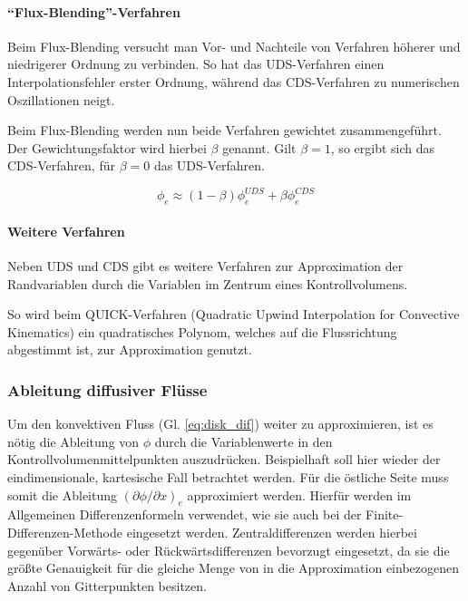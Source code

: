 \paragraph{``Flux-Blending''-Verfahren}

Beim Flux-Blending versucht man Vor- und Nachteile von Verfahren höherer und niedrigerer
Ordnung zu verbinden. So hat das UDS-Verfahren einen Interpolationsfehler erster Ordnung,
während das CDS-Verfahren zu numerischen Oszillationen neigt.

Beim Flux-Blending werden nun beide Verfahren gewichtet zusammengeführt. Der Gewichtungsfaktor
wird hierbei $\beta$ genannt. Gilt $\beta = 1$, so ergibt sich das CDS-Verfahren, für
$\beta = 0$ das UDS-Verfahren.

\begin{equation}
  \phi_e \approx (1-\beta)\phi_e^{UDS} + \beta \phi_e^{CDS}
  \label{eq:flux_blending}
\end{equation}



\paragraph{Weitere Verfahren}
Neben UDS und CDS gibt es weitere Verfahren zur Approximation der Randvariablen durch
die Variablen im Zentrum eines Kontrollvolumens.

So wird beim QUICK-Verfahren (Quadratic Upwind Interpolation for Convective
Kinematics) ein quadratisches Polynom, welches auf die Flussrichtung abgestimmt ist,
zur Approximation genutzt.



\subsubsection{Ableitung diffusiver Flüsse}
\label{sec:dif_fluss}

Um den konvektiven Fluss (Gl. \ref{eq:disk_dif}) weiter zu approximieren, ist es nötig die Ableitung von
$\phi$ durch die Variablenwerte in den Kontrollvolumenmittelpunkten auszudrücken.
Beispielhaft soll hier wieder der eindimensionale, kartesische Fall betrachtet werden.
Für die östliche Seite muss somit die Ableitung $(\partial \phi /\partial x)_e$ approximiert werden.
Hierfür werden im Allgemeinen Differenzenformeln verwendet, wie sie auch bei der
Finite-Differenzen-Methode eingesetzt werden. Zentraldifferenzen werden hierbei
gegenüber Vorwärts- oder Rückwärtsdifferenzen bevorzugt eingesetzt, da sie die größte
Genauigkeit für die gleiche Menge von in die Approximation einbezogenen Anzahl von Gitterpunkten
besitzen.

